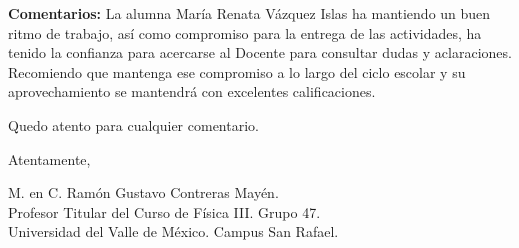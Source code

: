 \documentclass[14pt]{extarticle}
\begin{document}
\noindent
\textbf{Comentarios:}
La alumna María Renata Vázquez Islas ha mantiendo un buen ritmo de trabajo, así como compromiso para la entrega de las actividades, ha tenido la confianza para acercarse al Docente para consultar dudas y aclaraciones. Recomiendo que mantenga ese compromiso a lo largo del ciclo escolar y su aprovechamiento se mantendrá con excelentes calificaciones.

\vspace*{0.5cm}
\noindent
Quedo atento para cualquier comentario.

\vspace*{0.5cm}
\noindent
Atentamente,

\vspace*{2cm}
\noindent
M. en C. Ramón Gustavo Contreras Mayén. \\[0.5em]
Profesor Titular del Curso de Física III. Grupo 47.\\[0.5em]
Universidad del Valle de México. Campus San Rafael.
\end{document}
